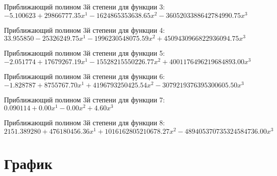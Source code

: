 \documentclass[a4paper,14pt]{extarticle}
\begin{document}
Приближающий полином 3й степени для функции 3: $-5.100623 + 29866777.35x^1 - 1624865353638.65x^2 - 3605203388642784990.75x^3$

Приближающий полином 3й степени для функции 4: $33.955850 - 25326249.75x^1 - 1996230548075.59x^2 + 4509430966822936094.75x^3$

Приближающий полином 3й степени для функции 5: $-2.051774 + 17679267.19x^1 - 15528215550226.77x^2 + 4001176496219684893.00x^3$

Приближающий полином 3й степени для функции 6: $-1.828787 + 8755767.70x^1 + 4196793250425.54x^2 - 3079219376395300605.50x^3$

Приближающий полином 3й степени для функции 7: $0.090114 + 0.00x^1 - 0.00x^2 + 4.60x^3$

Приближающий полином 3й степени для функции 8: $2151.389280 + 476180456.36x^1 + 1016162805210678.27x^2 - 489405370735324584736.00x^3$

\section{График}
\end{document}
